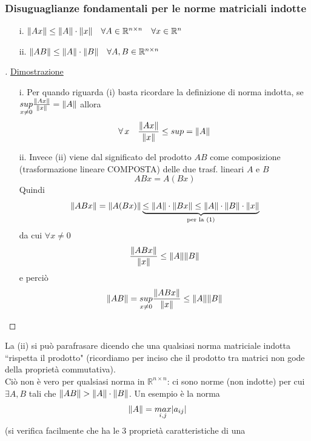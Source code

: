 \documentclass[12pt,a4paper]{article}
\DeclarePairedDelimiter{\norma}{\lVert}{\rVert}
\begin{document}
\subsubsection{Disuguaglianze fondamentali per le norme matriciali indotte}
\begin{enumerate}
    \item[i.] $\norma{Ax} \le \norma{A} \cdot \norma{x} \quad \forall A \in \mathbb{R}^{n \times n} \quad \forall x \in \mathbb{R}^n$
    
    \item[ii.] $\norma{AB} \le \norma{A} \cdot \norma{B} \quad \forall A, B \in \mathbb{R}^{n \times n}$
\end{enumerate}


\begin{proof}[\unskip\nopunct]
\uline{Dimostrazione}
\begin{enumerate}
\item[i.] Per quando riguarda (i) basta ricordare la definizione di norma
indotta, se $\underset{x \neq 0}{sup} \frac{\norma{Ax}}{\norma{x}} = \norma{A}$ allora 
\[\forall \, x \quad \frac{\norma{Ax}}{\norma{x}} \le sup = \norma{A}\]

\item[ii.] Invece (ii) viene dal significato del prodotto $AB$ come composizione (trasformazione lineare COMPOSTA) delle due trasf. lineari $A$ e $B$
\[ABx = A(Bx)\]
Quindi
\[\norma{ABx} = \norma{A(Bx)} \underbrace{\le \norma{A} \cdot \norma{Bx} \le \norma{A} \cdot \norma{B} \cdot \norma{x}}_{\text{per la (1)}}\]
da cui $\forall x \ne 0$
\[\frac{\norma{ABx}}{\norma{x}} \le \norma{A} \norma{B}\]
e perciò
\[\norma{AB} = \underset{x \neq 0}{sup} \frac{\norma{ABx}}{\norma{x}} \le \norma{A} \norma{B}\]
\end{enumerate}
\end{proof}
La (ii) si può parafrasare dicendo che una qualsiasi norma matriciale indotta ``rispetta il prodotto" (ricordiamo per inciso che il prodotto tra matrici non gode della proprietà commutativa).\\ Ciò non è vero per qualsiasi norma in $\mathbb{R}^{n\times n}$: ci sono norme (non indotte) per cui $\exists A,B$ tali che $\norma{AB}>\norma{A}\cdot\norma{B}$. Un esempio è la norma
\begin{equation*}
    \norma{A}=\underset{i,j}{max}|a_{ij}|
\end{equation*}
(si verifica facilmente che ha le 3 proprietà caratteristiche di una
\end{document}
